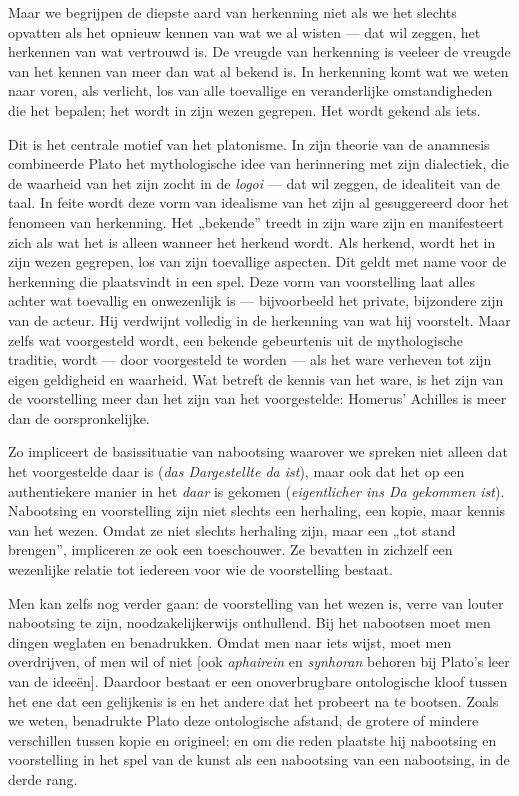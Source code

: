 Maar we begrijpen de diepste aard van herkenning niet als we het slechts opvatten als het opnieuw kennen van wat we al wisten — dat wil zeggen, het herkennen van wat vertrouwd is. De vreugde van herkenning is veeleer de vreugde van het kennen van meer dan wat al bekend is. In herkenning komt wat we weten naar voren, als verlicht, los van alle toevallige en veranderlijke omstandigheden die het bepalen; het wordt in zijn wezen gegrepen. Het wordt gekend als iets.

Dit is het centrale motief van het platonisme. In zijn theorie van de anamnesis combineerde Plato het mythologische idee van herinnering met zijn dialectiek, die de waarheid van het zijn zocht in de \textit{logoi} — dat wil zeggen, de idealiteit van de taal. In feite wordt deze vorm van idealisme van het zijn al gesuggereerd door het fenomeen van herkenning. Het „bekende” treedt in zijn ware zijn en manifesteert zich als wat het is alleen wanneer het herkend wordt. Als herkend, wordt het in zijn wezen gegrepen, los van zijn toevallige aspecten. Dit geldt met name voor de herkenning die plaatsvindt in een spel. Deze vorm van voorstelling laat alles achter wat toevallig en onwezenlijk is — bijvoorbeeld het private, bijzondere zijn van de acteur. Hij verdwijnt volledig in de herkenning van wat hij voorstelt. Maar zelfs wat voorgesteld wordt, een bekende gebeurtenis uit de mythologische traditie, wordt — door voorgesteld te worden — als het ware verheven tot zijn eigen geldigheid en waarheid. Wat betreft de kennis van het ware, is het zijn van de voorstelling meer dan het zijn van het voorgestelde: Homerus' Achilles is meer dan de oorspronkelijke.

Zo impliceert de basissituatie van nabootsing waarover we spreken niet alleen dat het voorgestelde daar is (\textit{das Dargestellte da ist}), maar ook dat het op een authentiekere manier in het \textit{daar} is gekomen (\textit{eigentlicher ins Da gekommen ist}). Nabootsing en voorstelling zijn niet slechts een herhaling, een kopie, maar kennis van het wezen. Omdat ze niet slechts herhaling zijn, maar een „tot stand brengen”, impliceren ze ook een toeschouwer. Ze bevatten in zichzelf een wezenlijke relatie tot iedereen voor wie de voorstelling bestaat.

Men kan zelfs nog verder gaan: de voorstelling van het wezen is, verre van louter nabootsing te zijn, noodzakelijkerwijs onthullend. Bij het nabootsen moet men dingen weglaten en benadrukken. Omdat men naar iets wijst, moet men overdrijven, of men wil of niet [ook \textit{aphairein} en \textit{synhoran} behoren bij Plato’s leer van de ideeën]. Daardoor bestaat er een onoverbrugbare ontologische kloof tussen het ene dat een gelijkenis is en het andere dat het probeert na te bootsen. Zoals we weten, benadrukte Plato deze ontologische afstand, de grotere of mindere verschillen tussen kopie en origineel; en om die reden plaatste hij nabootsing en voorstelling in het spel van de kunst als een nabootsing van een nabootsing, in de derde rang.

